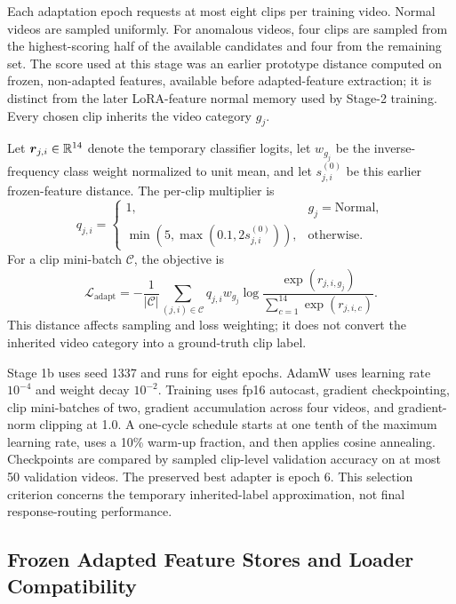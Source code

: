 Each adaptation epoch requests at most eight clips per training video. Normal videos are sampled uniformly. For anomalous videos, four clips are sampled from the highest-scoring half of the available candidates and four from the remaining set. The score used at this stage was an earlier prototype distance computed on frozen, non-adapted features, available before adapted-feature extraction; it is distinct from the later LoRA-feature normal memory used by Stage-2 training. Every chosen clip inherits the video category $g_j$.

Let $\boldsymbol{r}_{j,i}\in\mathbb{R}^{14}$ denote the temporary classifier logits, let $w_{g_j}$ be the inverse-frequency class weight normalized to unit mean, and let $s^{(0)}_{j,i}$ be this earlier frozen-feature distance. The per-clip multiplier is
\begin{equation}
    q_{j,i}=
    \begin{cases}
        1, & g_j=\text{Normal},\\
        \min\!\left(5,\max\!\left(0.1,2s^{(0)}_{j,i}\right)\right), & \text{otherwise}.
    \end{cases}
\end{equation}
For a clip mini-batch $\mathcal{C}$, the objective is
\begin{equation}
    \mathcal{L}_{\mathrm{adapt}}
    =-\frac{1}{|\mathcal{C}|}
      \sum_{(j,i)\in\mathcal{C}}
      q_{j,i}w_{g_j}
      \log\frac{\exp(r_{j,i,g_j})}
      {\sum_{c=1}^{14}\exp(r_{j,i,c})}.
    \label{eq:adapt-loss}
\end{equation}
This distance affects sampling and loss weighting; it does not convert the inherited video category into a ground-truth clip label.

Stage 1b uses seed 1337 and runs for eight epochs. AdamW \cite{loshchilov2018decoupled} uses learning rate $10^{-4}$ and weight decay $10^{-2}$. Training uses fp16 autocast, gradient checkpointing, clip mini-batches of two, gradient accumulation across four videos, and gradient-norm clipping at 1.0. A one-cycle schedule \cite{smith2019super} starts at one tenth of the maximum learning rate, uses a 10\% warm-up fraction, and then applies cosine annealing. Checkpoints are compared by sampled clip-level validation accuracy on at most 50 validation videos. The preserved best adapter is epoch 6. This selection criterion concerns the temporary inherited-label approximation, not final response-routing performance.

\subsection{Frozen Adapted Feature Stores and Loader Compatibility}

